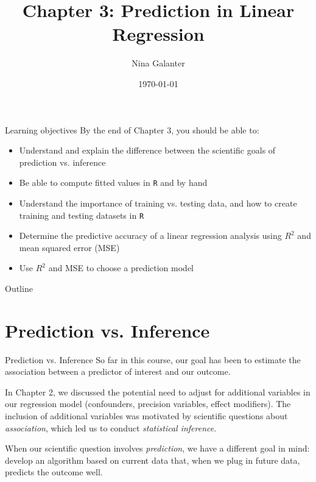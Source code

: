 \documentclass[10pt,t]{beamer}
\title{Chapter 3: Prediction in Linear Regression}
\author{Nina Galanter}
\date{\today}
\begin{document}
	\begin{frame}
	\titlepage 
\end{frame}

\begin{frame}{Learning objectives}
By the end of Chapter 3, you should be able to:

\vspace{0.3cm} 
\begin{itemize}
	\item Understand and explain the difference between the scientific goals of prediction vs. inference
	\item Be able to compute fitted values in \texttt{R} and by hand
	\item Understand the importance of training vs. testing data, and how to create training and testing datasets in \texttt{R}
	\item Determine the predictive accuracy of a linear regression analysis using $R^2$ and mean squared error (MSE)
	\item Use $R^2$ and MSE to choose a prediction model
\end{itemize}
\end{frame}

\begin{frame}{Outline}
\tableofcontents
\end{frame}




\section{Prediction vs. Inference}

\begin{frame}{Prediction vs. Inference}
So far in this course, our goal has been to estimate the association between a predictor of interest and our outcome.

\vspace{0.3cm}

In Chapter 2, we discussed the potential need to adjust for additional variables in our regression model (confounders, precision variables, effect modifiers). The inclusion of additional variables was motivated by scientific questions about \textit{association}, which led us to conduct \textit{statistical inference}.

\vspace{0.3cm}

When our scientific question involves \textit{prediction}, we have a different goal in mind: develop an algorithm based on current data that, when we plug in future data, predicts the outcome well.
\end{frame}
\end{document}

